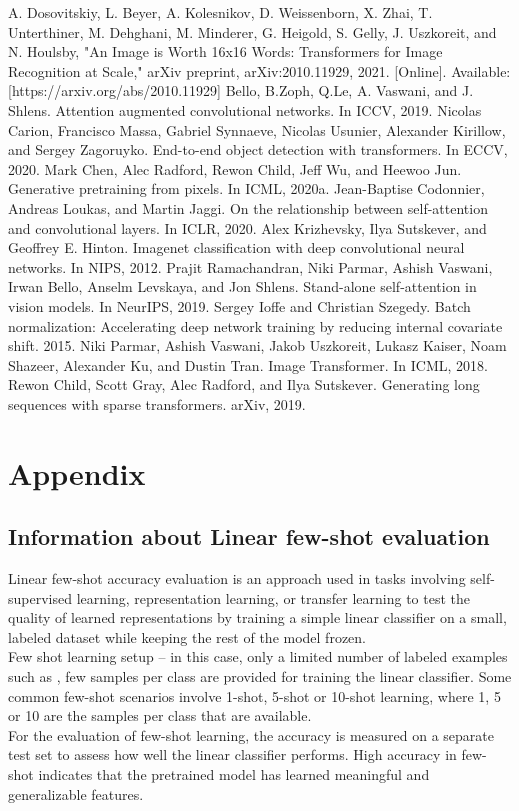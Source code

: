 \documentclass[conference]{IEEEtran}
\begin{document}
\begin{thebibliography}{00}
 A. Dosovitskiy, L. Beyer, A. Kolesnikov, D. Weissenborn, X. Zhai, T. Unterthiner, M. Dehghani, M. Minderer, G. Heigold, S. Gelly, J. Uszkoreit, and N. Houlsby, "An Image is Worth 16x16 Words: Transformers for Image Recognition at Scale," arXiv preprint, arXiv:2010.11929, 2021. [Online]. Available: [https://arxiv.org/abs/2010.11929]
 Bello, B.Zoph, Q.Le, A. Vaswani, and J. Shlens. Attention augmented convolutional networks. In ICCV, 2019.
 Nicolas Carion, Francisco Massa, Gabriel Synnaeve, Nicolas Usunier, Alexander Kirillow, and Sergey Zagoruyko. End-to-end object detection with transformers. In ECCV, 2020.
 Mark Chen, Alec Radford, Rewon Child, Jeff Wu, and Heewoo Jun. Generative pretraining from pixels. In ICML, 2020a.
 Jean-Baptise Codonnier, Andreas Loukas, and Martin Jaggi. On the relationship between self-attention and convolutional layers. In ICLR, 2020.
 Alex Krizhevsky, Ilya Sutskever, and Geoffrey E. Hinton. Imagenet classification with deep convolutional neural networks. In NIPS, 2012.
 Prajit Ramachandran, Niki Parmar, Ashish Vaswani, Irwan Bello, Anselm Levskaya, and Jon Shlens. Stand-alone self-attention in vision models. In NeurIPS, 2019.
 Sergey Ioffe and Christian Szegedy. Batch normalization: Accelerating deep network training by reducing internal covariate shift. 2015.
 Niki Parmar, Ashish Vaswani, Jakob Uszkoreit, Lukasz Kaiser, Noam Shazeer, Alexander Ku, and Dustin Tran. Image Transformer. In ICML, 2018.
 Rewon Child, Scott Gray, Alec Radford, and Ilya Sutskever. Generating long sequences with sparse transformers. arXiv, 2019.
\end{thebibliography}
\vspace{12pt}

\section{Appendix}
\subsection{Information about Linear few-shot evaluation}
Linear few-shot accuracy evaluation is an approach used in tasks involving self-supervised learning, representation learning, or transfer learning to test the quality of learned representations by training a simple linear classifier on a small, labeled dataset while keeping the rest of the model frozen. \\
Few shot learning setup – in this case, only a limited number of labeled examples such as , few samples per class are provided for training the linear classifier. Some common few-shot scenarios involve 1-shot, 5-shot or 10-shot learning, where 1, 5 or 10 are the samples per class that are available. \\
For the evaluation of few-shot learning, the accuracy is measured on a separate test set to assess how well the linear classifier performs. High accuracy in few-shot indicates that the pretrained model has learned meaningful and generalizable features.
\end{document}
